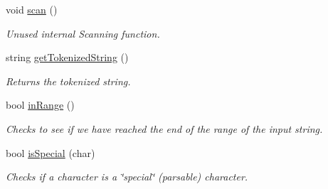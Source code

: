 \begin{DoxyCompactItemize}
void \hyperlink{classScanner_a83df585ae4ba0622b9b6c107b0581a1c}{scan} ()
\begin{DoxyCompactList}\small\item\em Unused internal Scanning function. \item\end{DoxyCompactList}\item 
string \hyperlink{classScanner_ad538231c15e7577c026a10be9b17f373}{getTokenizedString} ()
\begin{DoxyCompactList}\small\item\em Returns the tokenized string. \item\end{DoxyCompactList}\item 
bool \hyperlink{classScanner_a8c4ee8c91d2e7d9ab06c8dc6e86c4ca4}{inRange} ()
\begin{DoxyCompactList}\small\item\em Checks to see if we have reached the end of the range of the input string. \item\end{DoxyCompactList}\item 
bool \hyperlink{classScanner_afd047e2ead94064418395668a2c85253}{isSpecial} (char)
\begin{DoxyCompactList}\small\item\em Checks if a character is a \char`\"{}special\char`\"{} (parsable) character. \item\end{DoxyCompactList}\end{DoxyCompactItemize}
